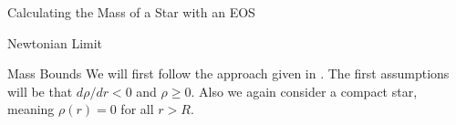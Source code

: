 \begin{section}{Calculating the Mass of a Star with an EOS}
\begin{subsection}{Newtonian Limit}
%
%
\end{subsection}
%
%
% 
%
%
\begin{subsection}{Mass Bounds}
We will first follow the approach given in \cite{waldGeneralRelativity1984}. 
The first assumptions will be that $d\rho/dr<0$ and $\rho\geq0$. 
Also we again consider a compact star, meaning $\rho(r)=0$ for all $r>R$.
%
%

\end{subsection}
\end{section}
